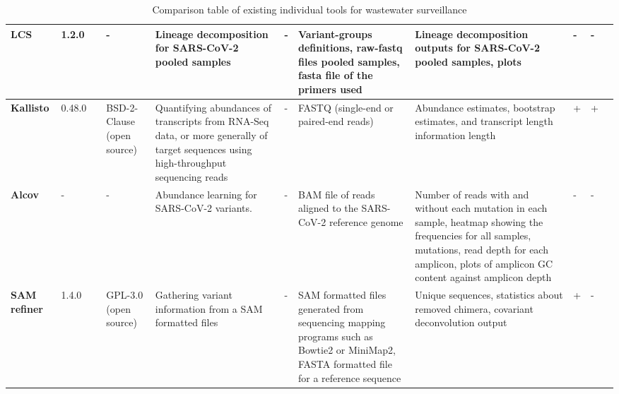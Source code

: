 \begin{landscape}
\begin{table}[ht!]
\begin{tabular}{l|l|l|l|l|l|l|l|l|l|l}
\multicolumn{1}{m{1cm}|}{\textbf{LCS}}&\multicolumn{1}{m{0.7cm}|}{1.2.0}&\multicolumn{1}{m{0.7cm}|}{\cite{valieris2022}}&\multicolumn{1}{m{0.75cm}|}{-}&\multicolumn{1}{m{3cm}|}{Lineage decomposition for SARS-CoV-2 pooled samples}&\multicolumn{1}{m{3cm}|}{-}&\multicolumn{1}{m{3cm}|}{Variant-groups definitions, raw-fastq files pooled samples, fasta file of the primers used}&\multicolumn{1}{m{3cm}|}{Lineage decomposition outputs for SARS-CoV-2 pooled samples, plots}&\multicolumn{1}{m{1cm}|}{-}&\multicolumn{1}{m{1cm}|}{-}&\multicolumn{1}{m{1cm}}{\cite{valieris2022,karthikeyan2022b}}\\ \hline 
\multicolumn{1}{m{1cm}|}{\textbf{Kallisto}}&\multicolumn{1}{m{0.7cm}|}{0.48.0}&\multicolumn{1}{m{0.7cm}|}{\cite{bray2016}}&\multicolumn{1}{m{0.75cm}|}{BSD-2-Clause (open source)}&\multicolumn{1}{m{3cm}|}{Quantifying abundances of transcripts from RNA-Seq data, or more generally of target sequences using high-throughput sequencing reads}&\multicolumn{1}{m{3cm}|}{-}&\multicolumn{1}{m{3cm}|}{FASTQ (single-end or paired-end reads)}&\multicolumn{1}{m{3cm}|}{Abundance estimates, bootstrap estimates, and transcript length information length}&\multicolumn{1}{m{1cm}|}{+}&\multicolumn{1}{m{1cm}|}{+}&\multicolumn{1}{m{1cm}}{\cite{baaijens2021,anton2022}}\\ \hline 
\multicolumn{1}{m{1cm}|}{\textbf{Alcov}}&\multicolumn{1}{m{0.7cm}|}{-}&\multicolumn{1}{m{0.7cm}|}{\cite{ellmen2021}}&\multicolumn{1}{m{0.75cm}|}{-}&\multicolumn{1}{m{3cm}|}{Abundance learning for SARS-CoV-2 variants.}&\multicolumn{1}{m{3cm}|}{-}&\multicolumn{1}{m{3cm}|}{BAM file of reads aligned to the SARS-CoV-2 reference genome}&\multicolumn{1}{m{3cm}|}{Number of reads with and without each mutation in each sample, heatmap showing the frequencies for all samples, mutations, read depth for each amplicon, plots of amplicon GC content against amplicon depth}&\multicolumn{1}{m{1cm}|}{-}&\multicolumn{1}{m{1cm}|}{-}&\multicolumn{1}{m{1cm}}{\cite{ellmen2021}}\\ \hline 
\multicolumn{1}{m{1cm}|}{\textbf{SAM refiner}}&\multicolumn{1}{m{0.7cm}|}{1.4.0}&\multicolumn{1}{m{0.7cm}|}{\cite{gregory2021}}&\multicolumn{1}{m{0.75cm}|}{GPL-3.0 (open source)}&\multicolumn{1}{m{3cm}|}{Gathering variant information from a SAM formatted files}&\multicolumn{1}{m{3cm}|}{-}&\multicolumn{1}{m{3cm}|}{SAM formatted files generated from sequencing mapping programs such as Bowtie2 or MiniMap2, FASTA formatted file for a reference sequence}&\multicolumn{1}{m{3cm}|}{Unique sequences, statistics about removed chimera, covariant deconvolution output}&\multicolumn{1}{m{1cm}|}{+}&\multicolumn{1}{m{1cm}|}{-}&\multicolumn{1}{m{1cm}}{\cite{gregory2021,gregory2022,yaglom2022}}\\ \hline 
\end{tabular}
                \caption{Comparison table of existing individual tools for wastewater surveillance} \label{tab:prior:methods-tools}
                \end{table}


\end{landscape}
